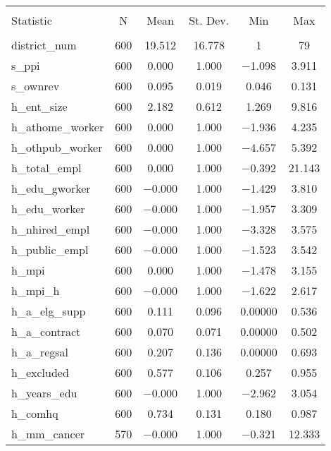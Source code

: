 
\begin{table}[!htbp] \centering 
  \caption{} 
  \label{} 
\begin{tabular}{@{\extracolsep{5pt}}lccccc} 
\\[-1.8ex]\hline 
\hline \\[-1.8ex] 
Statistic & \multicolumn{1}{c}{N} & \multicolumn{1}{c}{Mean} & \multicolumn{1}{c}{St. Dev.} & \multicolumn{1}{c}{Min} & \multicolumn{1}{c}{Max} \\ 
\hline \\[-1.8ex] 
district\_num & 600 & 19.512 & 16.778 & 1 & 79 \\ 
s\_ppi & 600 & 0.000 & 1.000 & $-$1.098 & 3.911 \\ 
s\_ownrev & 600 & 0.095 & 0.019 & 0.046 & 0.131 \\ 
h\_ent\_size & 600 & 2.182 & 0.612 & 1.269 & 9.816 \\ 
h\_athome\_worker & 600 & 0.000 & 1.000 & $-$1.936 & 4.235 \\ 
h\_othpub\_worker & 600 & 0.000 & 1.000 & $-$4.657 & 5.392 \\ 
h\_total\_empl & 600 & 0.000 & 1.000 & $-$0.392 & 21.143 \\ 
h\_edu\_gworker & 600 & $-$0.000 & 1.000 & $-$1.429 & 3.810 \\ 
h\_edu\_worker & 600 & $-$0.000 & 1.000 & $-$1.957 & 3.309 \\ 
h\_nhired\_empl & 600 & $-$0.000 & 1.000 & $-$3.328 & 3.575 \\ 
h\_public\_empl & 600 & $-$0.000 & 1.000 & $-$1.523 & 3.542 \\ 
h\_mpi & 600 & 0.000 & 1.000 & $-$1.478 & 3.155 \\ 
h\_mpi\_h & 600 & $-$0.000 & 1.000 & $-$1.622 & 2.617 \\ 
h\_a\_elg\_supp & 600 & 0.111 & 0.096 & 0.00000 & 0.536 \\ 
h\_a\_contract & 600 & 0.070 & 0.071 & 0.00000 & 0.502 \\ 
h\_a\_regsal & 600 & 0.207 & 0.136 & 0.00000 & 0.693 \\ 
h\_excluded & 600 & 0.577 & 0.106 & 0.257 & 0.955 \\ 
h\_years\_edu & 600 & $-$0.000 & 1.000 & $-$2.962 & 3.054 \\ 
h\_comhq & 600 & 0.734 & 0.131 & 0.180 & 0.987 \\ 
h\_mm\_cancer & 570 & $-$0.000 & 1.000 & $-$0.321 & 12.333 \\ 

\end{tabular}
\end{table}
